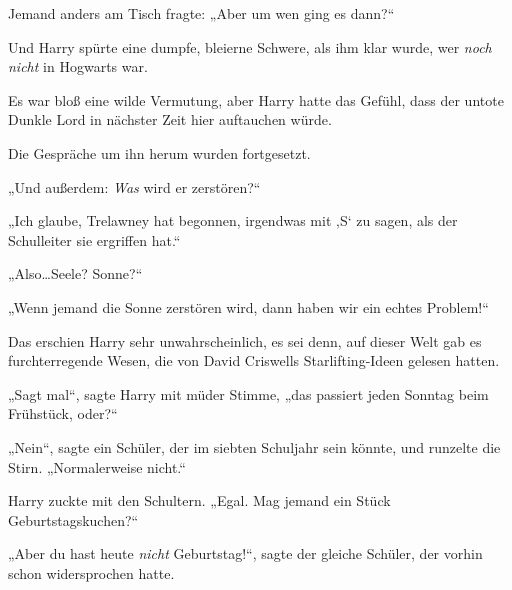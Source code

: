 Jemand anders am Tisch fragte: „Aber um wen ging es dann?“

Und Harry spürte eine dumpfe, bleierne Schwere, als ihm klar wurde, wer \emph{noch nicht} in Hogwarts war.

Es war bloß eine wilde Vermutung, aber Harry hatte das Gefühl, dass der untote Dunkle Lord in nächster Zeit hier auftauchen würde.

Die Gespräche um ihn herum wurden fortgesetzt.

„Und außerdem: \emph{Was} wird er zerstören?“

„Ich glaube, Trelawney hat begonnen, irgendwas mit ‚S‘ zu sagen, als der Schulleiter sie ergriffen hat.“

„Also…Seele? Sonne?“

„Wenn jemand die Sonne zerstören wird, dann haben wir ein echtes Problem!“

Das erschien Harry sehr unwahrscheinlich, es sei denn, auf dieser Welt gab es furchterregende Wesen, die von David Criswells Starlifting-Ideen gelesen hatten.

„Sagt mal“, sagte Harry mit müder Stimme, „das passiert jeden Sonntag beim Frühstück, oder?“

„Nein“, sagte ein Schüler, der im siebten Schuljahr sein könnte, und runzelte die Stirn. „Normalerweise nicht.“

Harry zuckte mit den Schultern. „Egal. Mag jemand ein Stück Geburtstagskuchen?“

„Aber du hast heute \emph{nicht} Geburtstag!“, sagte der gleiche Schüler, der vorhin schon widersprochen hatte.

